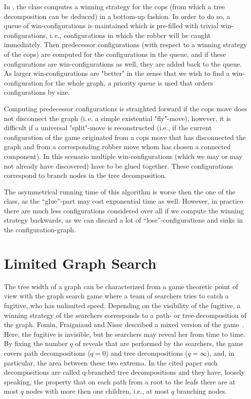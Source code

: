 \documentclass[a4paper, ukenglish, twoside, openright]{jdrasilmanual}
\begin{document}
In \Jdrasil, the class  computes a winning strategy for the cops (from which a tree
decomposition can be deduced) in a bottom-up fashion.  In order to do
so, a queue of win-configurations is maintained which is pre-filled
with trivial win-configurations, i.\,e., configurations in which the
robber will be caught immediately. Then predecessor configurations
(with respect to a winning strategy of the cops) are computed for the
configurations in the queue, and if these configurations are
win-configurations as well, they are added back to the queue.  As larger
win-configurations are "better" in the sense that we wish to find a
win-configuration for the whole graph, a priority queue is used that
orders configurations by size.
 
Computing predecessor configurations is straighted forward if the cops
move does not disconnect the graph (i.\,e. a simple existential
"fly"-move), however, it is difficult if a universal "split"-move is
reconstructed (i.e., if the current configuration of the game
originated from a cops move that has disconnected the graph and from a
corresponding robber move whom has chosen a connected component). In
this scenario multiple win-configurations (which we may or may not
already have discovered) have to be glued together. These
configurations correspond to branch nodes in the tree decomposition.

The asymmetrical running time of this algorithm is worse then the one
of the  class, as the ``glue''-part may cost
exponential time as well. However, in practice there are much less
configurations considered over all if we compute the winning strategy
backwards, as we can discard a lot of ``lose''-configurations and
sinks in the configuration-graph.

\section{Limited Graph Search}
The tree width of a graph can be characterized from a game theoretic
point of view with the graph search game where a team of searchers
tries to catch a fugitive, who has unlimited speed. Depending on the
visibility of the fugitive, a winning strategy of the searchers
corresponds to a path- or tree-decomposition of the graph. Fomin,
Fraigniaud and Nisse described a mixed version of the game~\cite{FominFN09}.
Here, the fugitive is invisible, but he searchers may reveal her from
time to time. By fixing the number \(q\) of reveals that are performed
by the searchers, the game covers path decompositions (\(q=0\)) and
tree decompositions (\(q=\infty\)), and, in particular, the area
between these two extrema. In the cited paper such decompositions are
called q-branched tree decompositions and they have, loosely speaking,
the property that on each path from a root to the leafs there are at
most \(q\) nodes with more then one children, i.e., at most \(q\)
branching nodes.
\end{document}
